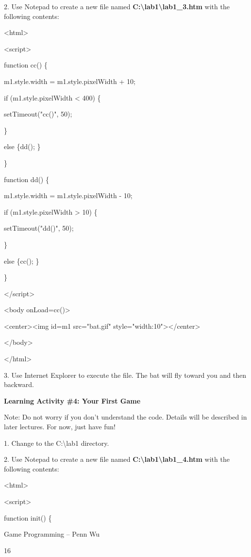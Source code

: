 \documentclass[
]{article}
\begin{document}
2. Use Notepad to create a new file named
\textbf{C:\textbackslash lab1\textbackslash lab1\_3.htm} with the
following contents:

\textless html\textgreater{}

\textless script\textgreater{}

function cc() \{

m1.style.width = m1.style.pixelWidth + 10;

if (m1.style.pixelWidth \textless{} 400) \{

setTimeout("cc()", 50);

\}

else \{dd(); \}

\}

function dd() \{

m1.style.width = m1.style.pixelWidth - 10;

if (m1.style.pixelWidth \textgreater{} 10) \{

setTimeout("dd()", 50);

\}

else \{cc(); \}

\}

\textless/script\textgreater{}

\textless body onLoad=cc()\textgreater{}

\textless center\textgreater\textless img id=m1 src="bat.gif"
style="width:10"\textgreater\textless/center\textgreater{}

\textless/body\textgreater{}

\textless/html\textgreater{}

3. Use Internet Explorer to execute the file. The bat will fly toward
you and then backward.

\textbf{Learning Activity \#4: Your First Game}

Note: Do not worry if you don't understand the code. Details will be
described in later lectures. For now, just have fun!

1. Change to the C:\textbackslash lab1 directory.

2. Use Notepad to create a new file named
\textbf{C:\textbackslash lab1\textbackslash lab1\_4.htm} with the
following contents:

\textless html\textgreater{}

\textless script\textgreater{}

function init() \{

Game Programming -- Penn Wu

16
\end{document}
